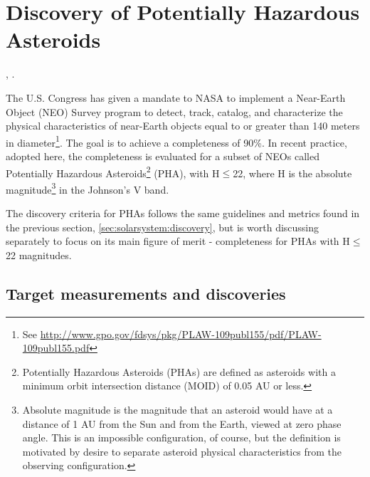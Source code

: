 %
%
%

\section{Discovery of Potentially Hazardous Asteroids}
\def\secname{\chpname:phas}\label{sec:\secname}

,
.

The U.S. Congress has given a mandate to NASA to implement a
Near-Earth Object (NEO) Survey program to detect, track, catalog, and
characterize the physical characteristics of near-Earth objects equal
to or greater than 140 meters in diameter\footnote{See
\url{http://www.gpo.gov/fdsys/pkg/PLAW-109publ155/pdf/PLAW-109publ155.pdf}}. The
goal is to achieve a completeness of 90\%. In recent practice, adopted
here, the completeness is evaluated for a subset of NEOs called
Potentially Hazardous Asteroids\footnote{Potentially Hazardous
Asteroids (PHAs) are defined as asteroids with a minimum orbit
intersection distance (MOID) of 0.05 AU or less.} (PHA), with
H$\le$22, where H is the absolute magnitude\footnote{Absolute
magnitude is the magnitude that an asteroid would have at a distance
of 1 AU from the Sun and from the Earth, viewed at zero phase
angle. This is an impossible configuration, of course, but the
definition is motivated by desire to separate asteroid physical
characteristics from the observing configuration.} in the Johnson's V
band.

The discovery criteria for PHAs follows the same guidelines and metrics found in the previous
section, \ref{sec:solarsystem:discovery}, but is worth discussing
separately to focus on its main figure
of merit - completeness for PHAs with H$\le$22 magnitudes.


\subsection{Target measurements and discoveries}
\label{sec:\secname:targets}

